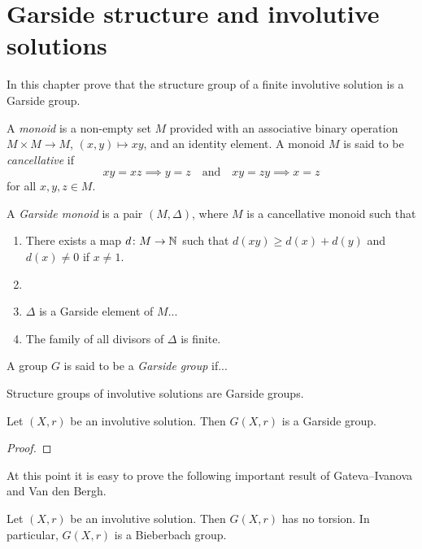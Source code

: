 \chapter{Garside structure and involutive solutions}

In this chapter prove that the structure group of a finite involutive solution
is a Garside group. 

A \emph{monoid} is a non-empty set $M$ provided 
with an associative binary operation $M\times M\to M$, $(x,y)\mapsto xy$, 
and an identity element. A monoid $M$ is said to be \emph{cancellative} 
if
\[
xy=xz\implies y=z
\quad
\text{and}
\quad 
xy=zy\implies x=z
\]
for all $x,y,z\in M$. 

\begin{definition}
A \emph{Garside monoid} is a pair $(M,\Delta)$, where $M$ is a cancellative monoid such that
\begin{enumerate}
    \item There exists a map $d\colon M\to\mathbb{N}$ such that $d(xy)\geq d(x)+d(y)$ and $d(x)\ne0$ if $x\ne 1$. 
    \item 
    \item $\Delta$ is a Garside element of $M$...
    \item The family of all divisors of $\Delta$ is finite. 
\end{enumerate}
\end{definition}

\begin{definition}
A group $G$ is said to be a \emph{Garside group} if...
\end{definition}

Structure groups of involutive solutions are Garside groups. 

\begin{theorem}
\label{thm:Chouraqui}
Let $(X,r)$ be an involutive solution. Then $G(X,r)$ is a Garside group.
\end{theorem}

\begin{proof}

\end{proof}

At this point it is easy to prove the following important result 
of Gateva--Ivanova and Van den Bergh. 

\begin{theorem}
\label{thm:torsion_free}
Let $(X,r)$ be an involutive solution. Then $G(X,r)$ has no torsion. In particular, $G(X,r)$ is a Bieberbach group.
\end{theorem}

